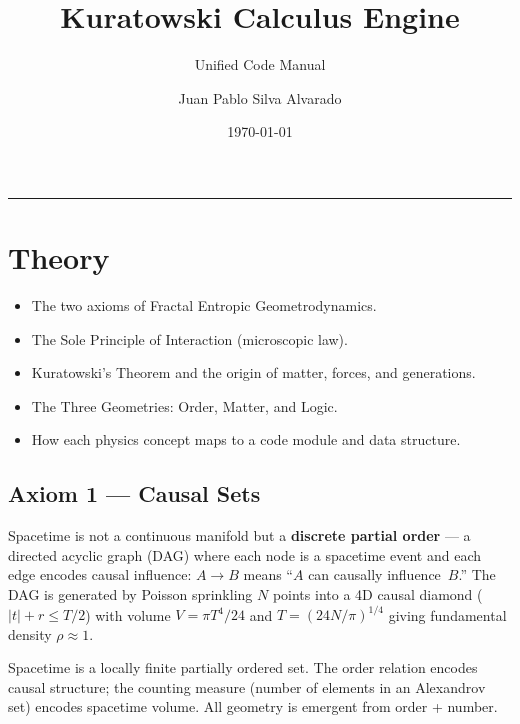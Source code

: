 \documentclass[11pt, a4paper, openany]{book}
\title{Kuratowski Calculus Engine}
\subtitle{Unified Code Manual}
\author{Juan Pablo Silva Alvarado}
\date{\today}
\makeatletter
\newenvironment{introduction}[1][Chapter Overview]{%
  \begin{tcolorbox}[
    enhanced,colback=structure!5,colframe=structure,
    colbacktitle=structure,coltitle=white,
    fonttitle=\small\bfseries,title={#1},
    arc=2pt,boxrule=0.7pt,
    left=8pt,right=8pt,top=6pt,bottom=6pt,
    before skip=12pt,after skip=12pt
  ]\itshape\begin{itemize}[leftmargin=*,itemsep=2pt,parsep=0pt]
}{%
  \end{itemize}\end{tcolorbox}
}
\gdef\@subtitle{}\gdef\@extrainfo{}
\renewcommand{\maketitle}{%
  \begin{titlepage}\centering
    \vspace*{4cm}
    {\Huge\bfseries\color{structure}\@title\par}\vspace{0.6cm}
    \ifx\@subtitle\empty\else{\Large\color{gray!80}\@subtitle\par}\fi
    \vspace{2cm}
    {\color{main}\rule{0.6\textwidth}{2pt}\par}\vspace{2cm}
    {\LARGE\@author\par}\vspace{1cm}
    {\large\@date\par}\vfill
    \ifx\@extrainfo\empty\else
      \begin{minipage}{0.8\textwidth}\centering\itshape\color{gray!60}\@extrainfo\end{minipage}\vspace{3cm}
    \fi
  \end{titlepage}
}
\makeatother
\begin{document}
\maketitle
\frontmatter
\tableofcontents
\mainmatter

\chapter{Theory}

\begin{introduction}
  \item The two axioms of Fractal Entropic Geometrodynamics.
  \item The Sole Principle of Interaction (microscopic law).
  \item Kuratowski's Theorem and the origin of matter, forces, and generations.
  \item The Three Geometries: Order, Matter, and Logic.
  \item How each physics concept maps to a code module and data structure.
\end{introduction}

\section{Axiom 1 --- Causal Sets}

Spacetime is not a continuous manifold but a \textbf{discrete partial order}
--- a directed acyclic graph (DAG) where each node is a spacetime event and
each edge encodes causal influence: $A \to B$ means ``$A$ can causally
influence~$B$.''  The DAG is generated by Poisson sprinkling $N$ points into a
4D causal diamond ($|t| + r \le T/2$) with volume $V = \pi T^4/24$ and
$T = (24N/\pi)^{1/4}$ giving fundamental density $\rho \approx 1$.

\begin{axiom}
Spacetime is a locally finite partially ordered set.  The order relation
encodes causal structure; the counting measure (number of elements in an
Alexandrov set) encodes spacetime volume.  All geometry is emergent from
order + number.
\end{axiom}

\end{document}
